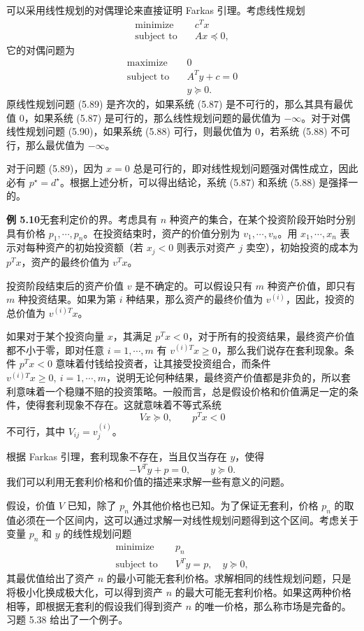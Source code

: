 \documentclass[UTF8,12pt,a4paper,fontset=fandol]{ctexart}
\begin{document}
可以采用线性规划的对偶理论来直接证明 Farkas 引理。考虑线性规划
\begin{equation}
\begin{aligned}
\text{minimize}\quad & c^Tx\\
\text{subject to}\quad & Ax\preceq 0,
\end{aligned}
\tag{5.89}
\end{equation}
它的对偶问题为
\begin{equation}
\begin{aligned}
\text{maximize}\quad & 0\\
\text{subject to}\quad & A^Ty+c=0\\
& y\succeq 0.
\end{aligned}
\tag{5.90}
\end{equation}
原线性规划问题 (5.89) 是齐次的，如果系统 (5.87) 是不可行的，那么其具有最优值 0，如果系统 (5.87) 是可行的，那么线性规划问题的最优值为 $-\infty$。对于对偶线性规划问题 (5.90)，如果系统 (5.88) 可行，则最优值为 0，若系统 (5.88) 不可行，那么最优值为 $-\infty$。

对于问题 (5.89)，因为 $x=0$ 总是可行的，即对线性规划问题强对偶性成立，因此必有 $p^\star=d^\star$。根据上述分析，可以得出结论，系统 (5.87) 和系统 (5.88) 是强择一的。

\noindent\textbf{例 5.10}\quad 无套利定价的界。考虑具有 $n$ 种资产的集合，在某个投资阶段开始时分别具有价格 $p_1,\cdots,p_n$。在投资结束时，资产的价值分别为 $v_1,\cdots,v_n$。用 $x_1,\cdots,x_n$ 表示对每种资产的初始投资额（若 $x_j<0$ 则表示对资产 $j$ 卖空），初始投资的成本为 $p^Tx$，资产的最终价值为 $v^Tx$。

投资阶段结束后的资产价值 $v$ 是不确定的。可以假设只有 $m$ 种资产价值，即只有 $m$ 种投资结果。如果为第 $i$ 种结果，那么资产的最终价值为 $v^{(i)}$，因此，投资的总价值为 $v^{(i)T}x$。

如果对于某个投资向量 $x$，其满足 $p^Tx<0$，对于所有的投资结果，最终资产价值都不小于零，即对任意 $i=1,\cdots,m$ 有 $v^{(i)T}x\geq 0$，那么我们说存在套利现象。条件 $p^Tx<0$ 意味着付钱给投资者，让其接受投资组合，而条件 $v^{(i)T}x\geq 0,\ i=1,\cdots,m$，说明无论何种结果，最终资产价值都是非负的，所以套利意味着一个稳赚不赔的投资策略。一般而言，总是假设价格和价值满足一定的条件，使得套利现象不存在。这就意味着不等式系统
\[
Vx\succeq 0,\qquad p^Tx<0
\]
不可行，其中 $V_{ij}=v_j^{(i)}$。

根据 Farkas 引理，套利现象不存在，当且仅当存在 $y$，使得
\[
-V^Ty+p=0,\qquad y\succeq 0.
\]
我们可以利用无套利价格和价值的描述来求解一些有意义的问题。

假设，价值 $V$ 已知，除了 $p_n$ 外其他价格也已知。为了保证无套利，价格 $p_n$ 的取值必须在一个区间内，这可以通过求解一对线性规划问题得到这个区间。考虑关于变量 $p_n$ 和 $y$ 的线性规划问题
\[
\begin{aligned}
\text{minimize}\quad & p_n\\
\text{subject to}\quad & V^Ty=p,\quad y\succeq 0,
\end{aligned}
\]
其最优值给出了资产 $n$ 的最小可能无套利价格。求解相同的线性规划问题，只是将极小化换成极大化，可以得到资产 $n$ 的最大可能无套利价格。如果这两种价格相等，即根据无套利的假设我们得到资产 $n$ 的唯一价格，那么称市场是完备的。习题 5.38 给出了一个例子。
\end{document}
